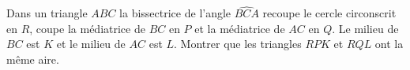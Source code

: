 Dans un triangle $ABC$ la bissectrice de l'angle $\widehat{BCA}$ recoupe le cercle circonscrit en $R$, coupe la
médiatrice de $BC$ en $P$ et la médiatrice de $AC$ en $Q$. Le milieu de $BC$ est $K$ et le milieu de $AC$ est
$L$. Montrer que les triangles $RPK$ et $RQL$ ont la même aire.
